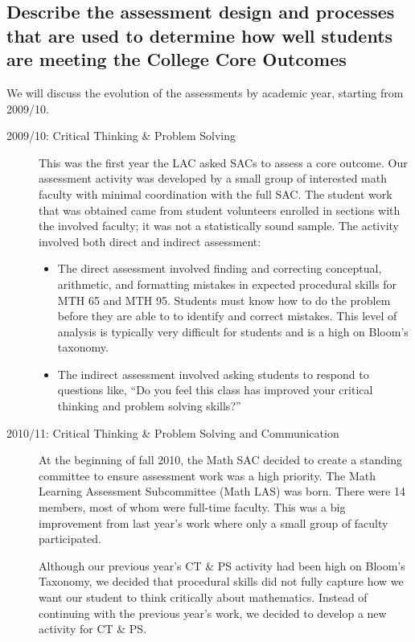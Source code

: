 \subsection{Describe the assessment design and processes that are used to
determine how well students are meeting the College Core Outcomes}
We will discuss the evolution of the assessments by academic year, starting 
from 2009/10.
\begin{description}
\item [2009/10: Critical Thinking  \& Problem Solving]

This was the first year the LAC asked SACs to assess a core outcome. Our
assessment activity was developed by a small group of interested math faculty
with minimal coordination with the full SAC. The student work that was obtained
came from student volunteers enrolled in sections with the involved faculty; it
was not a statistically sound sample.  The activity involved both direct and
indirect assessment: 
\begin{itemize}
\item The direct assessment involved finding and correcting conceptual,
  arithmetic, and formatting mistakes in expected procedural skills for MTH 65
  and MTH 95. Students must know how to do the problem before they are able to
  to identify and correct mistakes. This level of analysis is typically very
  difficult for students and is a high on Bloom's taxonomy.

\item The indirect assessment involved asking students to respond to questions
  like, ``Do you feel this class has improved your critical thinking and problem
  solving skills?''
\end{itemize}

\item[2010/11:  Critical Thinking \& Problem Solving and Communication]

At the beginning of fall 2010, the Math SAC decided to create a standing
committee to ensure assessment work was a high priority. The Math Learning
Assessment Subcommittee (Math LAS) was born.  There were 14 members, most of
whom were full-time faculty. This was a big improvement from last year's work
where only a small group of faculty participated.

Although our previous year's CT \& PS activity had been high on Bloom's
Taxonomy, we decided that procedural skills did not fully capture how we want
our student to think critically about mathematics.  Instead of continuing with
the previous year's work, we decided to develop a new activity for CT \& PS. 


\end{description}
